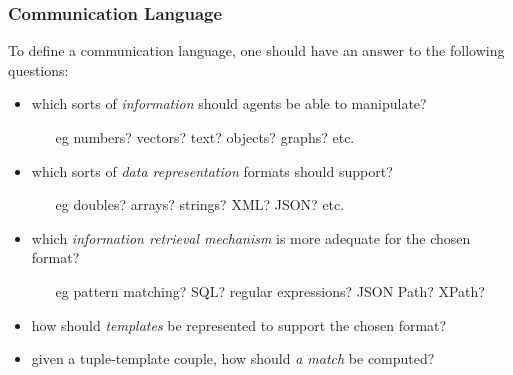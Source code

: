 \documentclass[presentation]{beamer}\mode<presentation>{\usetheme{AMSCesenaPurpleAndGold}}
\begin{document}
\begin{frame}%
	\frametitle{Communication Language}

	To define a communication language, one should have an answer to the following questions:
	\vfill
	\begin{itemize}
		\item which sorts of \emph{information} should agents be able to manipulate?
		\begin{itemize}
			\item[eg] numbers? vectors? text? objects? graphs? etc.
		\end{itemize}

		\vfill

		\item which sorts of \emph{data representation} formats should \linda{} support?
		\begin{itemize}
			\item[eg] doubles? arrays? strings? XML? JSON? etc.
		\end{itemize}

		\vfill

		\item which \emph{information retrieval mechanism} is more adequate for the chosen format?
		\begin{itemize}
			\item[eg] pattern matching? SQL? regular expressions? JSON Path? XPath?
		\end{itemize}

		\vfill

		\item how should \emph{templates} be represented to support the chosen format?

		\vfill

		\item given a tuple-template couple, how should \emph{a match} be computed?
	\end{itemize}

\end{frame}
\end{document}

